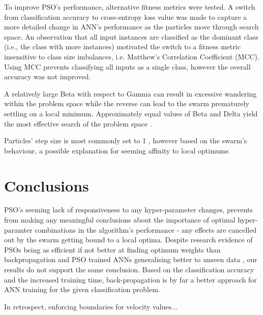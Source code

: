 \documentclass[12pt]{article}
\begin{document}
To improve PSO's performance, alternative fitness metrics were tested. A switch from classification accuracy to cross-entropy loss value was made to capture a more detailed change in ANN's performance as the particles move through search space.  An observation that all input instances are classified as the dominant class (i.e., the class with more instances) motivated the switch to a fitness metric insensitive to class size  imbalances, i.e. Matthew's Correlation Coefficient (MCC). Using MCC prevents classifying all inputs as a single class, however the overall accuracy was not improved. 


A relatively large Beta with respect to Gamma can result in excessive wandering within the problem space while the reverse  can lead to the swarm prematurely settling on a local minimum. Approximately equal values of Beta and Delta yield the most effective search of the problem space \cite{Kennedy}.

Particles' step size is most commonly set to 1 \cite{Luke}, however based on the swarm's behaviour, a possible explanation for seeming affinity to local optimums

\vspace{-1.5em}
\section{Conclusions}

PSO's seeming lack of responsiveness to any hyper-parameter changes, prevents from making any meaningful conclusions about the importance of optimal hyper-paramter combinations in the algorithm's performance - any effects are cancelled out by the swarm getting bound to a local optima. Despite research evidence of PSOs being as efficient if not better at finding optimum weights than backpropagation and PSO trained ANNs generalising better to unseen data \cite{Kennedy}, our results do not support the same conclusion. Based on the classification accuracy and the increased training time, back-propagation is by far a better approach for ANN training for the given classification problem.

In retrospect, enforcing boundaries for velocity values...
\end{document}
